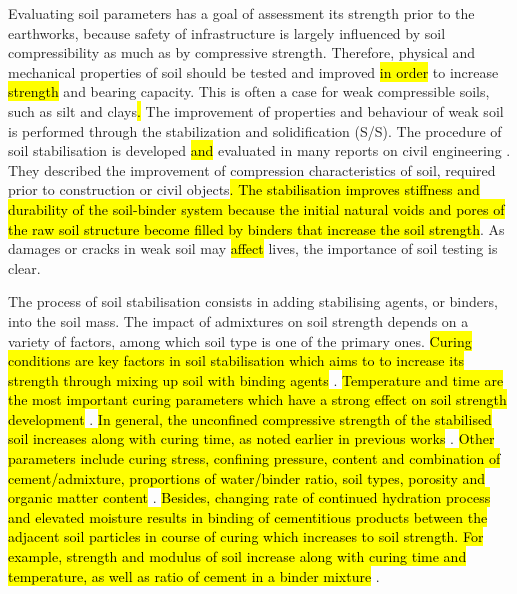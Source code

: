 \documentclass{amestyle}
\begin{document}
Evaluating soil parameters has a goal of assessment its strength prior to the earthworks, because safety of infrastructure is largely influenced by soil compressibility as much as by compressive strength. Therefore, physical and mechanical properties of soil should be tested and improved \hl{in order} to increase \hl{strength} and bearing capacity. This is often a case for weak compressible soils, such as silt and clays\hl{. }The improvement of properties and behaviour of weak soil is performed through the stabilization and solidification (S/S). The procedure of soil stabilisation is developed \hl{and} evaluated in many reports on civil engineering \cite{Jauberthie,Lindh202102,ArabiWild,Lindh2004}. They described the improvement of compression characteristics of soil, required prior to construction or civil objects\hl{. The stabilisation improves stiffness and durability of the soil-binder system because the initial natural voids and pores of the raw soil structure become filled by binders that increase the soil strength}. As damages or cracks in weak soil may \hl{affect }lives, the importance of soil testing is clear. 

The process of soil stabilisation consists in adding stabilising agents, or binders, into the soil mass. The impact of admixtures on soil strength depends on a variety of factors, among which soil type is one of the primary ones. \hl{Curing conditions are key factors in soil stabilisation which aims to to increase its strength through mixing up soil with binding agents} \cite{LiuStarcher,Oliveiraetal2012,Ghasemzadeh}. \hl{Temperature and time are the most important curing parameters which have a strong effect on soil strength development} \cite{Aldaood,Yuetal2017,Oh}. \hl{In general, the unconfined compressive strength of the stabilised soil increases along with curing time, as noted earlier in previous works} \cite{Howard,Lindh202102,Consoli}. \hl{Other parameters include curing stress, confining pressure, content and combination of cement/admixture, proportions of water/binder ratio, soil types, porosity and organic matter content} \cite{Rabbi,CHAIYAPUT2022e01082,Lindh2022,AMADI2018305}. \hl{Besides, changing rate of continued hydration process and elevated moisture results in binding of cementitious products between the adjacent soil particles in course of curing which increases to soil strength. For example, strength and modulus of soil increase along with curing time and temperature, as well as ratio of cement in a binder mixture} \cite{Wangetal2017}. 
\end{document}
